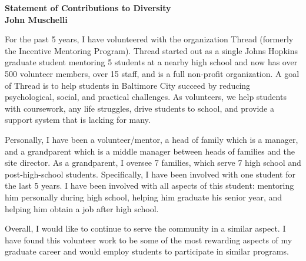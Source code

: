 \documentclass[12pt,a4paper]{article}
\author{John Muschelli}
\begin{document}
\thispagestyle{empty}

\begin{center}
{\bf
{\large Statement of Contributions to Diversity }\\
John Muschelli
}
\end{center}

For the past 5 years, I have volunteered with the organization Thread (formerly the Incentive Mentoring Program).  Thread started out as a single Johns Hopkins graduate student mentoring 5 students at a nearby high school and now has over 500 volunteer members, over 15 staff, and is a full non-profit organization.  A goal of Thread is to help students in Baltimore City succeed by reducing psychological, social, and practical challenges.  As volunteers, we help students with coursework, any life struggles, drive students to school, and provide a support system that is lacking for many.  

Personally, I have been a volunteer/mentor, a head of family which is a manager, and a grandparent which is a middle manager between heads of families and the site director.  As a grandparent, I oversee 7 families, which serve 7 high school and post-high-school students.  Specifically, I have been involved with one student for the last 5 years.  I have been involved with all aspects of this student: mentoring him personally during high school, helping him graduate his senior year, and helping him obtain a job after high school.  

Overall, I would like to continue to serve the community in a similar aspect.  I have found this volunteer work to be some of the most rewarding aspects of my graduate career and would employ students to participate in similar programs.  
\end{document}
